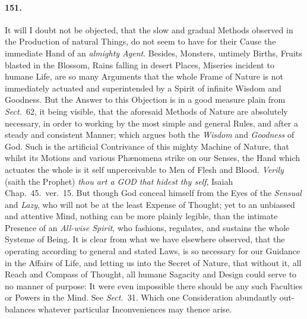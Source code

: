 \documentclass[]{article}
\newenvironment{sectionbody}{}{}
\begin{document}
\begin{sectionbody}
\paragraph{151.} It will I doubt not be objected, that the slow and gradual
Methods observed in the Production of natural Things, do not seem
to have for their Cause the immediate Hand of an \emph{almighty
Agent}.  Besides, Monsters, untimely Births, Fruits blasted in
the Blossom, Rains falling in desert Places, Miseries incident to
humane Life, are so many Arguments that the whole Frame of Nature
is not immediately actuated and superintended by a Spirit of
infinite Wisdom and Goodness.  But the Answer to this Objection
is in a good measure plain from \emph{Sect.}~62, it being visible,
that the aforesaid Methods of Nature are absolutely necessary, in
order to working by the most simple and general Rules, and after
a steady and consistent Manner; which argues both the
\emph{Wisdom} and \emph{Goodness} of {\sc God}.  Such is the
artificial Contrivance of this mighty Machine of Nature, that
whilst its Motions and various Ph{\ae}nomena strike on our
Senses, the Hand which actuates the whole is it self
unperceivable to Men of Flesh and Blood.  \emph{Verily} (saith
the Prophet) \emph{thou art a GOD that hidest thy self}, Isaiah
Chap.~45.\ ver.~15.  But though {\sc God} conceal himself from
the Eyes of the \emph{Sensual} and \emph{Lazy}, who will not be
at the least Expense of Thought; yet to an unbiassed and
attentive Mind, nothing can be more plainly legible, than the
intimate Presence of an \emph{All-wise Spirit}, who fashions,
regulates, and sustains the whole Systeme of Being.  It is clear
from what we have elsewhere observed, that the operating
according to general and stated Laws, is so necessary for our
Guidance in the Affairs of Life, and letting us into the Secret
of Nature, that without it, all Reach and Compass of Thought, all
humane Sagacity and Design could serve to no manner of purpose:
It were even impossible there should be any such Faculties or
Powers in the Mind.  See \emph{Sect.}~31.  Which one Consideration
abundantly out-balances whatever particular Inconveniences may
thence arise.




\end{sectionbody}
\end{document}

